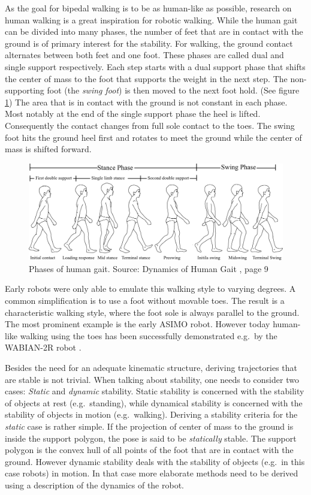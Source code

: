 \documentclass[english,ngerman]{KITreprt}
\newcommand{\name}[1]{\textsc{#1}}
\begin{document}
As the goal for bipedal walking is to be as human-like as possible,
research on human walking is a great inspiration for robotic walking.
While the human gait can be divided into many phases, the number of feet
that are in contact with the ground is of primary interest for the
stability. For walking, the ground contact alternates between both feet
and one foot. These phases are called dual and single support
respectively. Each step starts with a dual support phase that shifts the
center of mass to the foot that supports the weight in the next step.
The non-supporting foot (the \emph{swing foot}) is then moved to the
next foot hold. (See figure \ref{img:human-gait}) The area that is in
contact with the ground is not constant in each phase. Most notably at
the end of the single support phase the heel is lifted. Consequently the
contact changes from full sole contact to the toes. The swing foot hits
the ground heel first and rotates to meet the ground while the center of
mass is shifted forward.

\begin{figure}[tb]
\vspace*{-1em}
\includegraphics[width=\textwidth]{images/human_gait.png}
\caption{Phases of human gait. Source: Dynamics of Human Gait \cite{vaughan1992dynamics}, page 9}
\label{img:human-gait}
\end{figure}

Early robots were only able to emulate this walking style to varying
degrees. A common simplification is to use a foot without movable toes.
The result is a characteristic walking style, where the foot sole is
always parallel to the ground. The most prominent example is the early
\name{ASIMO} robot. However today human-like walking using the toes has
been successfully demonstrated e.g.~by the \name{WABIAN-2R} robot
\cite{ogura2006human}.

Besides the need for an adequate kinematic structure, deriving
trajectories that are stable is not trivial. When talking about
stability, one needs to consider two cases: \emph{Static} and
\emph{dynamic} stability. Static stability is concerned with the
stability of objects at rest (e.g.~standing), while dynamical stability
is concerned with the stability of objects in motion (e.g.~walking).
Deriving a stability criteria for the \emph{static} case is rather
simple. If the projection of center of mass to the ground is inside the
support polygon, the pose is said to be \emph{statically} stable. The
support polygon is the convex hull of all points of the foot that are in
contact with the ground. However dynamic stability deals with the
stability of objects (e.g.~in this case robots) in motion. In that case
more elaborate methods need to be derived using a description of the
dynamics of the robot.
\end{document}
